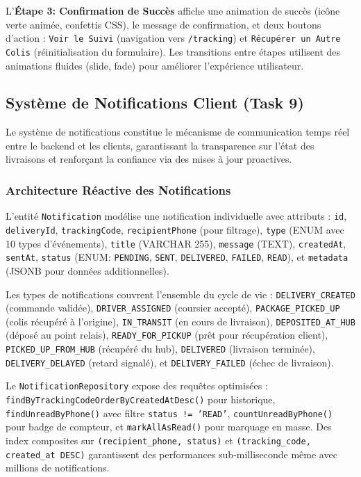 L'\textbf{Étape 3: Confirmation de Succès} affiche une animation de succès (icône verte animée, confettis CSS), le message de confirmation, et deux boutons d'action : \texttt{Voir le Suivi} (navigation vers \texttt{/tracking}) et \texttt{Récupérer un Autre Colis} (réinitialisation du formulaire). Les transitions entre étapes utilisent des animations fluides (slide, fade) pour améliorer l'expérience utilisateur.

\subsection{Système de Notifications Client (Task 9)}

Le système de notifications constitue le mécanisme de communication temps réel entre le backend et les clients, garantissant la transparence sur l'état des livraisons et renforçant la confiance via des mises à jour proactives.

\subsubsection{Architecture Réactive des Notifications}

L'entité \texttt{Notification} modélise une notification individuelle avec attributs : \texttt{id}, \texttt{deliveryId}, \texttt{trackingCode}, \texttt{recipientPhone} (pour filtrage), \texttt{type} (ENUM avec 10 types d'événements), \texttt{title} (VARCHAR 255), \texttt{message} (TEXT), \texttt{createdAt}, \texttt{sentAt}, \texttt{status} (ENUM: \texttt{PENDING}, \texttt{SENT}, \texttt{DELIVERED}, \texttt{FAILED}, \texttt{READ}), et \texttt{metadata} (JSONB pour données additionnelles).

Les types de notifications couvrent l'ensemble du cycle de vie : \texttt{DELIVERY\_CREATED} (commande validée), \texttt{DRIVER\_ASSIGNED} (coursier accepté), \texttt{PACKAGE\_PICKED\_UP} (colis récupéré à l'origine), \texttt{IN\_TRANSIT} (en cours de livraison), \texttt{DEPOSITED\_AT\_HUB} (déposé au point relais), \texttt{READY\_FOR\_PICKUP} (prêt pour récupération client), \texttt{PICKED\_UP\_FROM\_HUB} (récupéré du hub), \texttt{DELIVERED} (livraison terminée), \texttt{DELIVERY\_DELAYED} (retard signalé), et \texttt{DELIVERY\_FAILED} (échec de livraison).

Le \texttt{NotificationRepository} expose des requêtes optimisées : \texttt{findByTrackingCodeOrderByCreatedAtDesc()} pour historique, \texttt{findUnreadByPhone()} avec filtre \texttt{status != 'READ'}, \texttt{countUnreadByPhone()} pour badge de compteur, et \texttt{markAllAsRead()} pour marquage en masse. Des index composites sur \texttt{(recipient\_phone, status)} et \texttt{(tracking\_code, created\_at DESC)} garantissent des performances sub-milliseconde même avec millions de notifications.

